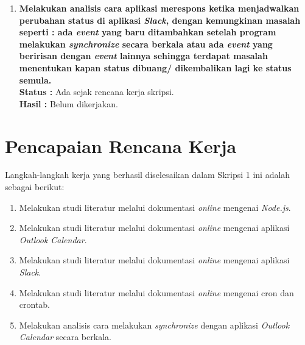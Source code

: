 \documentclass[a4paper,twoside]{article}
\begin{document}
\begin{enumerate}
\begin{lstlisting}[caption=contoh cronfile]
\label{lst:contoh_cronfile}
# use /bin/sh to run commands, no matter what /etc/passwd says
SHELL=/bin/sh
# mail any output to 'paul', no matter whose crontab this is
MAILTO=paul
#
CRON_TZ=Japan
# run five minutes after midnight, every day
5 0 * * *       $HOME/bin/daily.job >> $HOME/tmp/out 2>&1
# run at 2:15pm on the first of every month -- output mailed to paul
15 14 1 * *     $HOME/bin/monthly
# run at 10 pm on weekdays, annoy Joe
0 22 * * 1-5    mail -s "It's 10pm" joe%Joe,%%Where are your kids?%
23 0-23/2 * * * echo "run 23 minutes after midn, 2am, 4am ..., everyday"
5 4 * * sun     echo "run at 5 after 4 every sunday"
\end{lstlisting}

		\item \textbf{Melakukan analisis cara aplikasi merespons ketika menjadwalkan perubahan status di aplikasi \textit{Slack}, dengan kemungkinan masalah seperti : ada \textit{event} yang baru ditambahkan setelah program melakukan \textit{synchronize} secara berkala atau ada \textit{event} yang beririsan dengan \textit{event} lainnya sehingga terdapat masalah menentukan kapan status dibuang/ dikembalikan lagi ke status semula.}\\
		{\bf Status :} Ada sejak rencana kerja skripsi.\\
		{\bf Hasil :} Belum dikerjakan. 

		
	\end{enumerate}

\section{Pencapaian Rencana Kerja}
Langkah-langkah kerja yang berhasil diselesaikan dalam Skripsi 1 ini adalah sebagai berikut:
\begin{enumerate}
\item Melakukan studi literatur melalui dokumentasi \textit{online} mengenai \textit{Node.js}.
\item Melakukan studi literatur melalui dokumentasi \textit{online} mengenai aplikasi \textit{Outlook Calendar}.
\item Melakukan studi literatur melalui dokumentasi \textit{online} mengenai aplikasi \textit{Slack}.
\item Melakukan studi literatur melalui dokumentasi \textit{online} mengenai cron dan crontab. 
\item Melakukan analisis cara melakukan \textit{synchronize} dengan aplikasi \textit{Outlook Calendar} secara berkala.
\end{enumerate}
\end{document}
